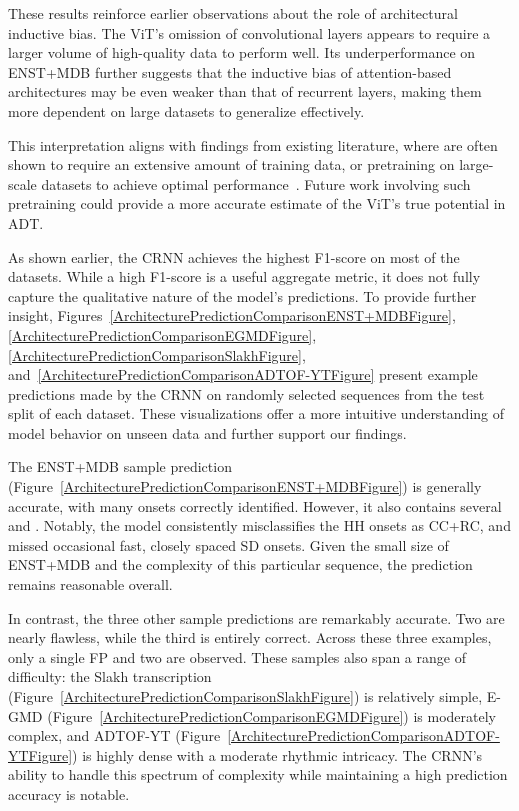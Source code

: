 These results reinforce earlier observations about the role of architectural inductive bias. The \gls{ViT}'s omission of convolutional layers appears to require a larger volume of high-quality data to perform well. Its underperformance on ENST+MDB further suggests that the inductive bias of attention-based architectures may be even weaker than that of recurrent layers, making them more dependent on large datasets to generalize effectively. 

This interpretation aligns with findings from existing literature, where  are often shown to require an extensive amount of training data, or pretraining on large-scale datasets to achieve optimal performance~\cite{dosovitskiy2021imageworth16x16words}. Future work involving such pretraining could provide a more accurate estimate of the \gls{ViT}'s true potential in \gls{ADT}.

As shown earlier, the \acrfull{CRNN} achieves the highest F1-score on most of the datasets. While a high F1-score is a useful aggregate metric, it does not fully capture the qualitative nature of the model's predictions. To provide further insight, Figures~\ref{ArchitecturePredictionComparisonENST+MDBFigure}, \ref{ArchitecturePredictionComparisonEGMDFigure}, \ref{ArchitecturePredictionComparisonSlakhFigure}, and~\ref{ArchitecturePredictionComparisonADTOF-YTFigure} present example predictions made by the \gls{CRNN} on randomly selected sequences from the test split of each dataset. These visualizations offer a more intuitive understanding of model behavior on unseen data and further support our findings.

The ENST+MDB sample prediction (Figure~\ref{ArchitecturePredictionComparisonENST+MDBFigure}) is generally accurate, with many onsets correctly identified. However, it also contains several  and . Notably, the model consistently misclassifies the \acrfull{HH} onsets as \acrfull{CC+RC}, and missed occasional fast, closely spaced \acrfull{SD} onsets. Given the small size of ENST+MDB and the complexity of this particular sequence, the prediction remains reasonable overall.

In contrast, the three other sample predictions are remarkably accurate. Two are nearly flawless, while the third is entirely correct. Across these three examples, only a single \acrshort{FP} and two  are observed. These samples also span a range of difficulty: the Slakh transcription (Figure~\ref{ArchitecturePredictionComparisonSlakhFigure}) is relatively simple, E-GMD (Figure~\ref{ArchitecturePredictionComparisonEGMDFigure}) is moderately complex, and ADTOF-YT (Figure~\ref{ArchitecturePredictionComparisonADTOF-YTFigure}) is highly dense with a moderate rhythmic intricacy. The \gls{CRNN}'s ability to handle this spectrum of complexity while maintaining a high prediction accuracy is notable.


